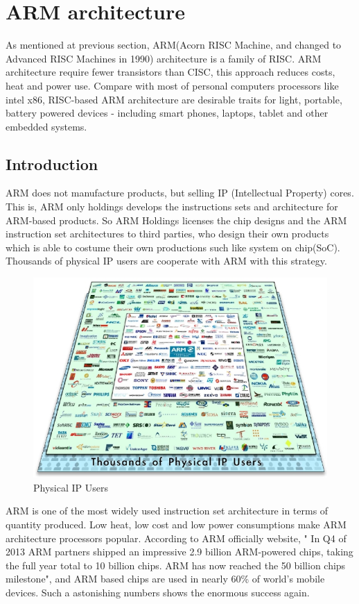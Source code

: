 \documentclass[conference]{IEEEtran}
\begin{document}
\section{ARM architecture}

As mentioned at previous section, ARM(Acorn RISC Machine, and changed to Advanced RISC Machines in 1990) architecture is a family of RISC. ARM architecture require fewer transistors than CISC, this approach reduces costs, heat and power use. Compare with most of personal computers processors like intel x86, RISC-based ARM architecture are desirable traits for light, portable, battery powered devices - including smart phones, laptops, tablet and other embedded systems. \cite{ARM1}

\subsection{Introduction}
ARM does not manufacture products, but selling IP (Intellectual Property) cores. This is, ARM only holdings develops the instructions sets and  architecture for ARM-based products. So ARM Holdings licenses the chip designs and the ARM instruction set architectures to third parties, who design their own products which is able to costume their own productions such like system on chip(SoC). Thousands of physical IP users are cooperate with ARM with this strategy.\cite{ARM1}

\begin{figure}[h]
  \includegraphics[width=\linewidth]{IPUSER.jpg}
  \caption{Physical IP Users}
  \label{fig:User}
\end{figure}

ARM is one of the most widely used instruction set architecture in terms of quantity produced. Low heat, low cost and low power consumptions make ARM architecture processors popular. According to ARM officially website, " In Q4 of 2013 ARM partners shipped an impressive 2.9 billion ARM-powered chips, taking the full year total to 10 billion chips. ARM has now reached the 50 billion chips milestone", and ARM based chips are used in nearly 60\% of world's mobile devices.\cite{ARM2} Such a astonishing numbers shows the enormous success again. 
\end{document}
